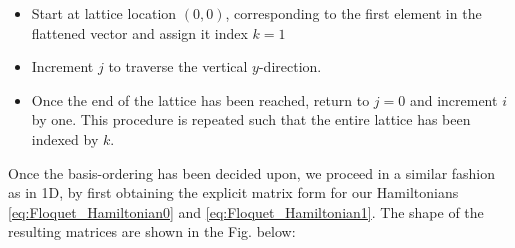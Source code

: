 \documentclass[11pt, a4paper, oneside]{book}
\theoremstyle{definition} %
\begin{document}
\begin{itemize}
	\item Start at lattice location $(0,0)$, corresponding to the first element in the flattened vector and assign it index $k = 1$
	\item Increment $j$ to traverse the vertical $y$-direction.
	\item Once the end of the lattice has been reached, return to $j = 0$ and increment $i$ by one. This procedure is repeated such that the entire lattice has been indexed by $k$.
\end{itemize}
Once the basis-ordering has been decided upon, we proceed in a similar fashion as in 1D, by first obtaining the explicit matrix form for our Hamiltonians \ref{eq:Floquet_Hamiltonian0} and \ref{eq:Floquet_Hamiltonian1}. The shape of the resulting matrices are shown in the Fig. below:
\end{document}
